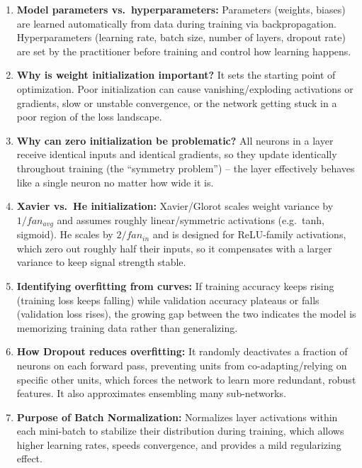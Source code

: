 \documentclass[10pt]{article}
\begin{document}
\begin{enumerate}

\item \textbf{Model parameters vs.\ hyperparameters:} Parameters
(weights, biases) are learned automatically from data during training via
backpropagation. Hyperparameters (learning rate, batch size, number of
layers, dropout rate) are set by the practitioner before training and
control how learning happens.

\item \textbf{Why is weight initialization important?} It sets the
starting point of optimization. Poor initialization can cause
vanishing/exploding activations or gradients, slow or unstable
convergence, or the network getting stuck in a poor region of the loss
landscape.

\item \textbf{Why can zero initialization be problematic?} All neurons in
a layer receive identical inputs and identical gradients, so they update
identically throughout training (the ``symmetry problem'') -- the layer
effectively behaves like a single neuron no matter how wide it is.

\item \textbf{Xavier vs.\ He initialization:} Xavier/Glorot scales weight
variance by $1/fan_{avg}$ and assumes roughly linear/symmetric activations
(e.g.\ tanh, sigmoid). He scales by $2/fan_{in}$ and is designed for
ReLU-family activations, which zero out roughly half their inputs, so it
compensates with a larger variance to keep signal strength stable.

\item \textbf{Identifying overfitting from curves:} If training accuracy
keeps rising (training loss keeps falling) while validation accuracy
plateaus or falls (validation loss rises), the growing gap between the
two indicates the model is memorizing training data rather than
generalizing.

\item \textbf{How Dropout reduces overfitting:} It randomly deactivates a
fraction of neurons on each forward pass, preventing units from
co-adapting/relying on specific other units, which forces the network to
learn more redundant, robust features. It also approximates ensembling
many sub-networks.

\item \textbf{Purpose of Batch Normalization:} Normalizes layer
activations within each mini-batch to stabilize their distribution during
training, which allows higher learning rates, speeds convergence, and
provides a mild regularizing effect.


\end{enumerate}
\end{document}
